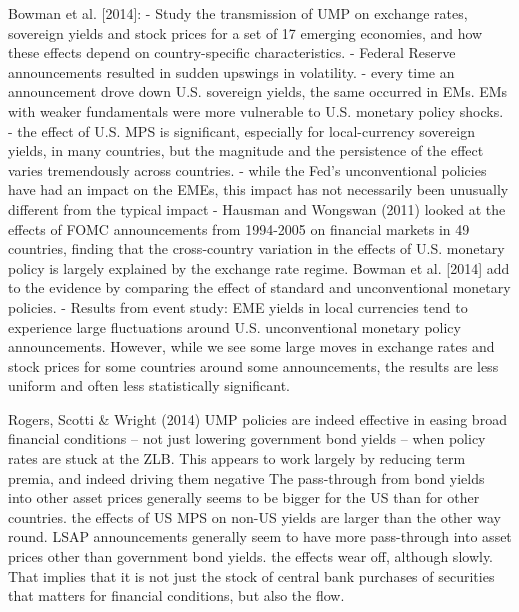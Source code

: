 Bowman et al. [2014]:
- Study the transmission of UMP on exchange rates, sovereign yields and stock prices for a set of 17 emerging economies, and how these effects depend on country-specific characteristics.
- Federal Reserve announcements resulted in sudden upswings in volatility.
- every time an announcement drove down U.S. sovereign yields, the same occurred in EMs. EMs with weaker fundamentals were more vulnerable to U.S. monetary policy shocks.
- the effect of U.S. MPS is significant, especially for local-currency sovereign yields, in many countries, but the magnitude and the persistence of the effect varies tremendously across countries.
- while the Fed's unconventional policies have had an impact on the EMEs, this impact has not necessarily been unusually different from the typical impact
- Hausman and Wongswan (2011) looked at the effects of FOMC announcements from 1994-2005 on financial markets in 49 countries, finding that the cross-country variation in the effects of U.S. monetary policy is largely explained by the exchange rate regime. Bowman et al. [2014] add to the evidence by comparing the effect of standard and unconventional monetary policies.
- Results from event study: EME yields in local currencies tend to experience large fluctuations around U.S. unconventional monetary policy announcements. However, while we see some large moves in exchange rates and stock prices for some countries around some announcements, the results are less uniform and often less statistically significant.

Rogers, Scotti \& Wright (2014)
UMP policies are indeed effective in easing broad financial conditions – not just lowering government bond yields – when policy rates are stuck at the ZLB.
This appears to work largely by reducing term premia, and indeed driving them negative
The pass-through from bond yields into other asset prices generally seems to be bigger for the US than for other countries.
the effects of US MPS on non-US yields are larger than the other way round.
LSAP announcements generally seem to have more pass-through into asset prices other than government bond yields.
the effects wear off, although slowly. That implies that it is not just the stock of central bank purchases of securities that matters for financial conditions, but
also the flow.


